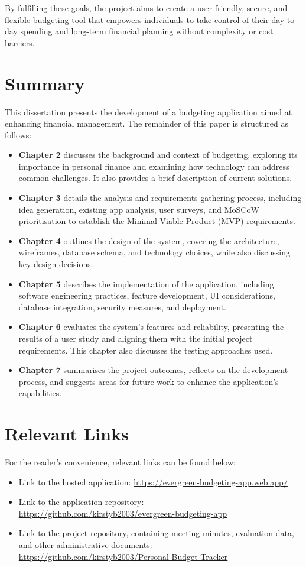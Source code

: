 \documentclass{l4proj}
\begin{document}
By fulfilling these goals, the project aims to create a user-friendly, secure, and flexible budgeting tool that empowers individuals to take control of their day-to-day spending and long-term financial planning without complexity or cost barriers.


\section{Summary}
This dissertation presents the development of a budgeting application aimed at enhancing financial management. The remainder of this paper is structured as follows:

\begin{itemize}
    \item \textbf{Chapter 2} discusses the background and context of budgeting, exploring its importance in personal finance and examining how technology can address common challenges. It also provides a brief description of current solutions.
    \item \textbf{Chapter 3} details the analysis and requirements-gathering process, including idea generation, existing app analysis, user surveys, and MoSCoW prioritisation to establish the Minimal Viable Product (MVP) requirements.
    \item \textbf{Chapter 4} outlines the design of the system, covering the architecture, wireframes, database schema, and technology choices, while also discussing key design decisions.
    \item \textbf{Chapter 5} describes the implementation of the application, including software engineering practices, feature development, UI considerations, database integration, security measures, and deployment.
    \item \textbf{Chapter 6} evaluates the system’s features and reliability, presenting the results of a user study and aligning them with the initial project requirements. This chapter also discusses the testing approaches used.
    \item \textbf{Chapter 7} summarises the project outcomes, reflects on the development process, and suggests areas for future work to enhance the application’s capabilities.
\end{itemize}

\section{Relevant Links}
For the reader's convenience, relevant links can be found below:
\begin{itemize}
    \item Link to the hosted application: \url{https://evergreen-budgeting-app.web.app/}
    \item Link to the application repository: \url{https://github.com/kirstyb2003/evergreen-budgeting-app}
    \item Link to the project repository, containing meeting minutes, evaluation data, and other administrative documents: \url{https://github.com/kirstyb2003/Personal-Budget-Tracker}
\end{itemize}
\end{document}
